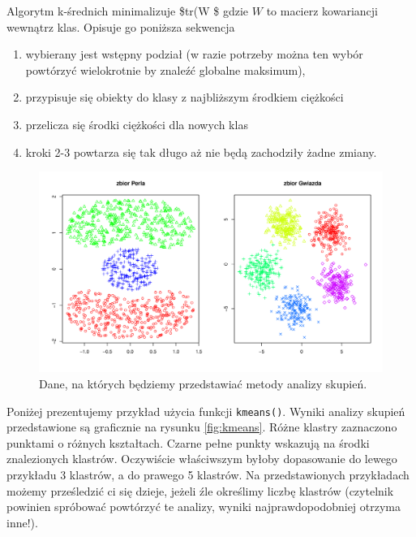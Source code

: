 \documentclass[polish,]{book}
\begin{document}
Algorytm k-średnich minimalizuje \$tr(W \$ gdzie \(W\) to macierz kowariancji wewnątrz klas. Opisuje go poniższa sekwencja

\begin{enumerate}
\def\labelenumi{\arabic{enumi}.}
\item
  wybierany jest wstępny podział (w razie potrzeby można ten wybór powtórzyć
  wielokrotnie by znaleźć globalne maksimum),
\item
  przypisuje się obiekty do klasy z najbliższym środkiem ciężkości
\item
  przelicza się środki ciężkości dla nowych klas
\item
  kroki 2-3 powtarza się tak długo aż nie będą zachodziły żadne zmiany.
\end{enumerate}

\begin{figure}[h]

{\centering \includegraphics[width=1\linewidth]{mlbench} 

}

\caption{Dane, na których będziemy przedstawiać metody analizy skupień.}\label{fig:mlbench}
\end{figure}

Poniżej prezentujemy przykład użycia funkcji \texttt{kmeans()}. Wyniki analizy skupień
przedstawione są graficznie na rysunku \ref{fig:kmeans}. Różne klastry zaznaczono punktami
o różnych kształtach. Czarne pełne punkty wskazują na środki znalezionych klastrów. Oczywiście właściwszym byłoby dopasowanie do lewego przykładu 3 klastrów, a do prawego 5 klastrów. Na przedstawionych przykładach możemy prześledzić ci się dzieje, jeżeli źle określimy liczbę klastrów (czytelnik powinien spróbować powtórzyć te analizy, wyniki najprawdopodobniej otrzyma inne!).
\end{document}
